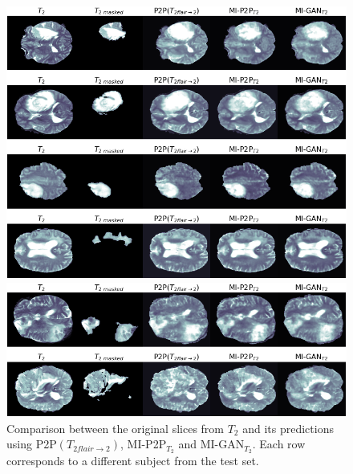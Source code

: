 \newpage
\begin{figure}[H]
\centering

\vspace{20mm}

\includegraphics[width=0.635\textheight]{images/gen_t2.1.pdf}

\vspace{2mm}

\includegraphics[width=0.635\textheight]{images/gen_t2.2.pdf}
\caption[Qualitative results from the generation of $T_{2}$]{Comparison between the original slices from $T_{2}$ and its predictions using P2P$(T_{2flair \rightarrow 2})$, MI-P2P{$_{T_{2}}$} and MI-GAN{$_{T_{2}}$}. Each row corresponds to a different subject from the test set.}
\label{fig:t2_gen}
\end{figure}

